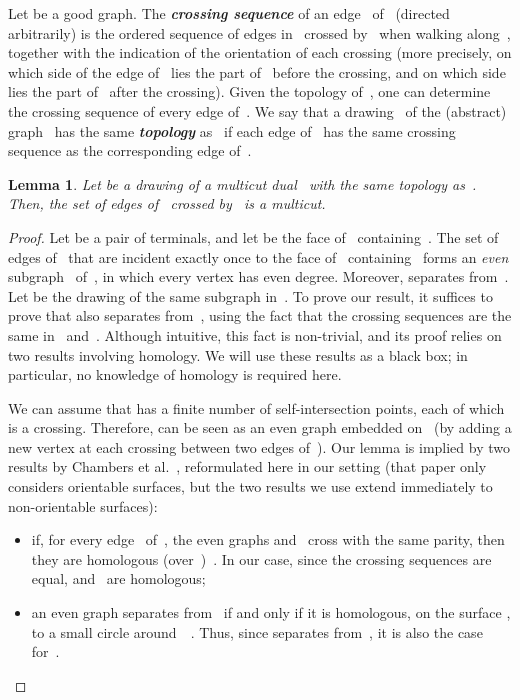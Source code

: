 \documentclass[11pt]{article}
\newcommand{\emphdef}[1]{\textcolor{blueblack}{\textbf{\emph{#1}}}}
\theoremstyle{plain}  \newtheorem{theorem}{Theorem}[section]
\newtheorem{lemma}[theorem]{Lemma}
\theoremstyle{definition}
\begin{document}
Let  be a good graph.  The \emphdef{crossing sequence} of an edge~
of~ (directed arbitrarily) is the ordered sequence of edges in~
crossed by~ when walking along~, together with the indication of the
orientation of each crossing (more precisely, on which side of the edge
of~ lies the part of~ before the crossing, and on which side lies the
part of~ after the crossing).  Given the topology of~, one can
determine the crossing sequence of every edge of~.  We say that a
drawing~ of the (abstract) graph~ has the same \emphdef{topology}
as~ if each edge of~ has the same crossing sequence as the
corresponding edge of~.
\begin{lemma}\label{L:dualref}
  Let  be a drawing of a multicut dual~ with the same topology
  as~.  Then, the set of edges of~ crossed by~ is a multicut.
\end{lemma}
\begin{proof}
  Let  be a pair of terminals, and let  be the face
  of~ containing~.  The set of edges of~ that are incident
  exactly once to the face of~ containing~ forms an \emph{even}
  subgraph~ of~, in which every vertex has even degree.  Moreover,
   separates  from~.  Let  be the drawing of the same
  subgraph in~.  To prove our result, it suffices to prove that 
  also separates  from~, using the fact that the crossing
  sequences are the same in~ and~.  Although intuitive, this
  fact is non-trivial, and its proof relies on two results involving
  homology.  We will use these results as a black box; in particular, no
  knowledge of homology is required here.

  We can assume that  has a finite number of self-intersection points,
  each of which is a crossing.  Therefore,  can be seen as an even
  graph embedded on~ (by adding a new vertex at each crossing between
  two edges of~).  Our lemma is implied by two results by Chambers et
  al.~\cite{cen-mcshc-09}, reformulated here in our setting (that paper
  only considers orientable surfaces, but the two results we use extend
  immediately to non-orientable surfaces):
  \begin{itemize}
  \item if, for every edge~ of~, the even graphs  and~
    cross  with the same parity, then they are homologous
    (over~)~\cite[Lemma~3.4]{cen-mcshc-09}.  In our case, since the
    crossing sequences are equal,  and~ are homologous;
  \item an even graph separates  from~ if and only if it is
    homologous, on the surface , to a small circle
    around~~\cite[Lemma~3.1]{cen-mcshc-09}.  Thus, since 
    separates  from~, it is also the case for~.\qedhere
  \end{itemize}
\end{proof}
\end{document}
